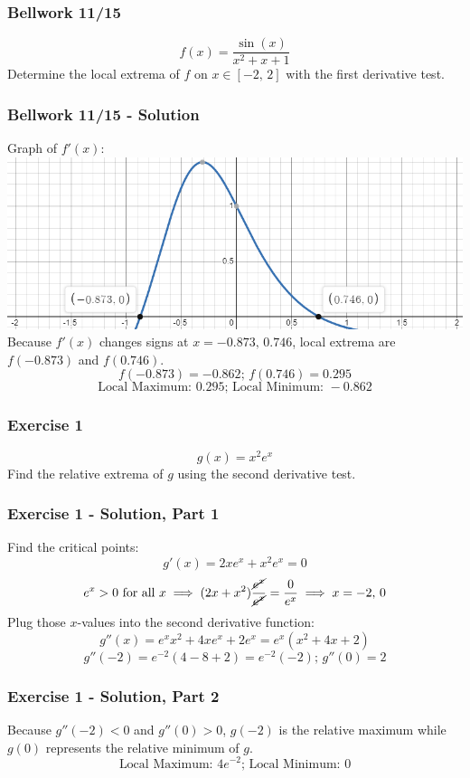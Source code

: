 \documentclass[12pt]{beamer}
\begin{document}
\begin{frame}
	\frametitle{Bellwork 11/15}
	\initclock

	\vfill
	\vfill
	\vfill
	\vfill
	\Large
	\[f(x)=\frac{\sin(x)}{x^2+x+1}\]
	\vfill
	Determine the local extrema of $f$ on $x\in[-2\text{, }2]$ with the first derivative test.
	\vfill
	\vfill
	\vfill
	\vfill

	\small
	\crono
\end{frame}
\begin{frame}
	\frametitle{Bellwork 11/15 - Solution}

	Graph of $f'(x)$:
	\includegraphics[scale=0.5]{exercise_1_solution_graph.png}
	\vfill
	Because $f'(x)$ changes signs at $x=-0.873\text{, }0.746$, local extrema are $f(-0.873)$ and $f(0.746)$.
	\[f(-0.873)=-0.862\text{; }f(0.746)=0.295\]
	\[\boxed{\text{Local Maximum: }0.295\text{; Local Minimum: }-0.862}\]
\end{frame}
\begin{frame}
	\frametitle{Exercise 1}

	\vfill
	\vfill
	\vfill
	\Large
	\[g(x)=x^2e^x\]
	\vfill
	Find the relative extrema of $g$ using the second derivative test.
	\vfill
	\vfill
	\vfill
\end{frame}
\begin{frame}
	\frametitle{Exercise 1 - Solution, Part 1}

	Find the critical points:
	\[g'(x)=2xe^x+x^2e^x=0\]
	\[\text{$e^x>0$ for all $x$}\implies (2x+x^2)\frac{\cancel{e^x}}{\cancel{e^x}}=\frac{0}{e^x}\implies x=-2\text{, }0\]
	Plug those $x$-values into the second derivative function:
	\[g''(x)=e^xx^2+4xe^x+2e^x=e^x(x^2+4x+2)\]
	\[g''(-2)=e^{-2}(4-8+2)=e^{-2}(-2)\text{; }g''(0)=2\]
\end{frame}
\begin{frame}
	\frametitle{Exercise 1 - Solution, Part 2}

	Because $g''(-2)<0$ and $g''(0)>0$, $g(-2)$ is the relative maximum while $g(0)$ represents the relative minimum of $g$.
	\[\boxed{\text{Local Maximum: }4e^{-2}\text{; Local Minimum: }0}\]
\end{frame}
\end{document}
